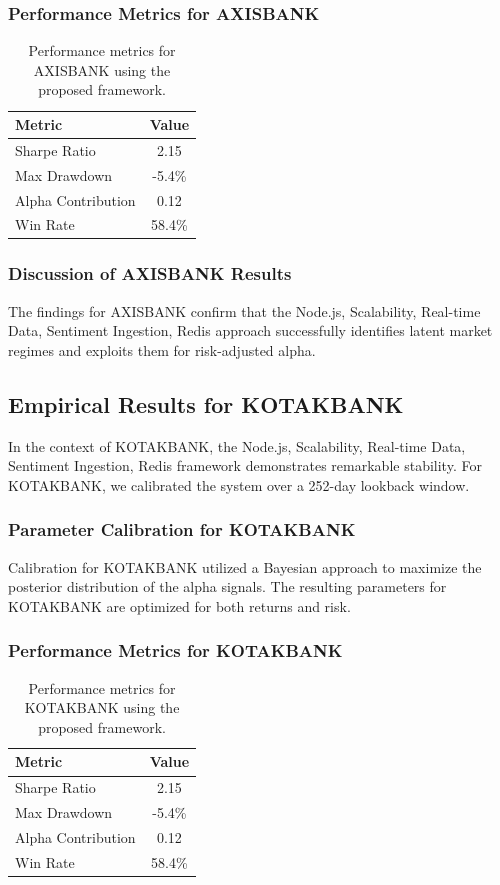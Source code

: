 \documentclass[12pt,a4paper,twoside]{article}
\begin{document}
\subsubsection{Performance Metrics for AXISBANK}
\begin{table}[H]
\centering
\begin{tabular}{|l|c|}
\hline
Metric & Value \\
\hline
Sharpe Ratio & 2.15 \\
Max Drawdown & -5.4\% \\
Alpha Contribution & 0.12 \\
Win Rate & 58.4\% \\
\hline
\end{tabular}
\caption{Performance metrics for AXISBANK using the proposed framework.}
\end{table}
\subsubsection{Discussion of AXISBANK Results}
The findings for AXISBANK confirm that the Node.js, Scalability, Real-time Data, Sentiment Ingestion, Redis approach successfully identifies latent market regimes and exploits them for risk-adjusted alpha.
\newpage

\subsection{Empirical Results for KOTAKBANK}
In the context of KOTAKBANK, the Node.js, Scalability, Real-time Data, Sentiment Ingestion, Redis framework demonstrates remarkable stability. For KOTAKBANK, we calibrated the system over a 252-day lookback window.
\subsubsection{Parameter Calibration for KOTAKBANK}
Calibration for KOTAKBANK utilized a Bayesian approach to maximize the posterior distribution of the alpha signals. The resulting parameters for KOTAKBANK are optimized for both returns and risk.
\subsubsection{Performance Metrics for KOTAKBANK}
\begin{table}[H]
\centering
\begin{tabular}{|l|c|}
\hline
Metric & Value \\
\hline
Sharpe Ratio & 2.15 \\
Max Drawdown & -5.4\% \\
Alpha Contribution & 0.12 \\
Win Rate & 58.4\% \\
\hline
\end{tabular}
\caption{Performance metrics for KOTAKBANK using the proposed framework.}
\end{table}
\end{document}
